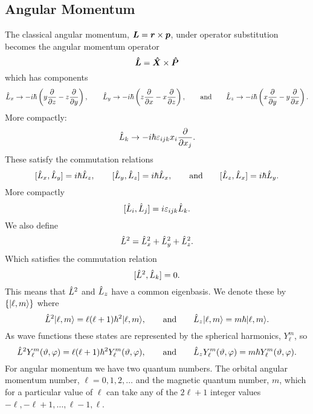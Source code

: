 \subsection{Angular Momentum}
The classical angular momentum, \(\bm{L} = \bm{r}\times\bm{p}\), under operator substitution becomes the angular momentum operator
\[\bm{\hat{L}} = \bm{\hat{X}}\times\bm{\hat{P}}\]
which has components
\[\hat{L}_x \mathrel{\rightarrow} -i\hbar\left(y\pdv{z} - z\pdv{y}\right), \qquad \hat{L}_y \mathrel{\rightarrow} -i\hbar\left(z\pdv{x} - x\pdv{z}\right), \qquad\text{and}\qquad \hat{L}_z \mathrel{\rightarrow} -i\hbar\left(x\pdv{y} - y\pdv{x}\right).\]
More compactly:
\[\hat{L}_k \mathrel{\rightarrow} -i\hbar\varepsilon_{ijk}x_i\pdv{x_j}.\]
These satisfy the commutation relations
\[[\hat{L}_x, \hat{L}_y] = i\hbar\hat{L}_z, \qquad [\hat{L}_y, \hat{L}_z] = i\hbar\hat{L}_x, \qquad\text{and}\qquad [\hat{L}_z, \hat{L}_x] = i\hbar\hat{L}_y.\]
More compactly
\[[\hat{L}_i, \hat{L}_j] = i\varepsilon_{ijk}\hat{L}_k.\]
We also define
\[\hat{L}^2 = \hat{L}_x^2 + \hat{L}_y^2 + \hat{L}_z^2.\]
Which satisfies the commutation relation
\[[\hat{L}^2, \hat{L}_k] = 0.\]
This means that \(\hat{L}^2\) and \(\hat{L}_z\) have a common eigenbasis.
We denote these by \(\{\vert {\ell, m} \rangle\}\) where
\[\hat{L}^2\vert {\ell, m} \rangle = \ell(\ell + 1)\hbar^2\vert {\ell, m} \rangle, \qquad\text{and}\qquad \hat{L}_z\vert {\ell, m} \rangle = m\hbar\vert {\ell, m} \rangle.\]
As wave functions these states are represented by the spherical harmonics, \(Y_\ell^m\), so
\[\hat{L}^2Y_\ell^m(\vartheta, \varphi) = \ell(\ell + 1)\hbar^2Y_\ell^m(\vartheta, \varphi), \qquad\text{and}\qquad \hat{L}_zY_\ell^m(\vartheta, \varphi) = m\hbar Y_\ell^m(\vartheta, \varphi).\]
For angular momentum we have two quantum numbers.
The orbital angular momentum number, \(\ell = 0, 1, 2, \dotsc\) and the magnetic quantum number, \(m\), which for a particular value of \(\ell\) can take any of the \(2\ell + 1\) integer values \(-\ell, -\ell + 1, \dotsc, \ell - 1, \ell\).

